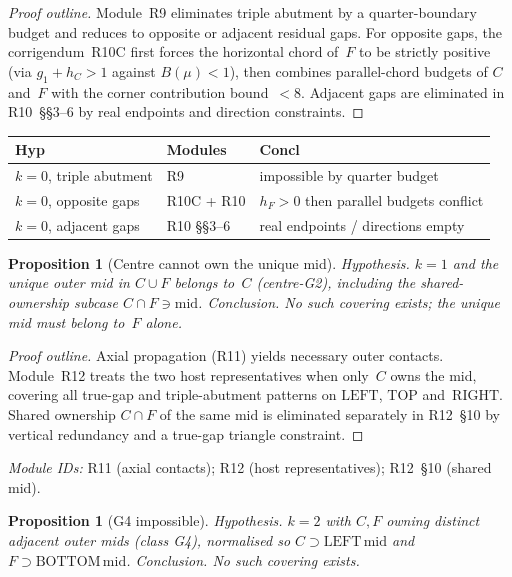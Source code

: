 \documentclass[11pt,reqno]{amsart}
\newtheorem{proposition}[theorem]{Proposition}
\theoremstyle{definition}
\newcommand{\RIGHT}{\mathrm{RIGHT}}
\newcommand{\TOP}{\mathrm{TOP}}
\newcommand{\LEFT}{\mathrm{LEFT}}
\begin{document}
\begin{proof}[Proof outline]
Module~R9 eliminates triple abutment by a quarter-boundary budget and reduces
to opposite or adjacent residual gaps.  For opposite gaps, the corrigendum~R10C
first forces the horizontal chord of~$F$ to be strictly positive (via
$g_1+h_C>1$ against $B(\mu)<1$), then combines parallel-chord budgets of $C$
and~$F$ with the corner contribution bound~$<8$.  Adjacent gaps are eliminated
in R10~\S\S3--6 by real endpoints and direction constraints.
\end{proof}

\begin{center}
\small
\begin{tabular}{@{}llp{}@{}}
\toprule
Hyp & Modules & Concl \\
\midrule
$k=0$, triple abutment & R9 & impossible by quarter budget \\
$k=0$, opposite gaps & R10C + R10 & $h_F>0$ then parallel budgets conflict \\
$k=0$, adjacent gaps & R10 §§3--6 & real endpoints / directions empty \\
\bottomrule
\end{tabular}
\end{center}

\begin{proposition}[Centre cannot own the unique mid]\label{prop:M43}
\emph{Hypothesis.} $k=1$ and the unique outer mid in $C\cup F$ belongs to~$C$
(centre-G2), including the shared-ownership subcase $C\cap F\ni\mathrm{mid}$.
\emph{Conclusion.} No such covering exists; the unique mid must belong to~$F$
alone.
\end{proposition}

\begin{proof}[Proof outline]
Axial propagation (R11) yields necessary outer contacts.  Module~R12 treats
the two host representatives when only~$C$ owns the mid, covering all true-gap
and triple-abutment patterns on $\LEFT$, $\TOP$ and~$\RIGHT$.  Shared ownership
$C\cap F$ of the same mid is eliminated separately in R12~\S10 by vertical
redundancy and a true-gap triangle constraint.
\end{proof}

\noindent\textit{Module IDs:} R11 (axial contacts); R12 (host representatives);
R12~\S10 (shared mid).

\begin{proposition}[G4 impossible]\label{prop:M51}
\emph{Hypothesis.} $k=2$ with $C,F$ owning distinct \emph{adjacent} outer mids
(class G4), normalised so $C\supset\mathrm{LEFT\,mid}$ and
$F\supset\mathrm{BOTTOM\,mid}$.
\emph{Conclusion.} No such covering exists.
\end{proposition}
\end{document}

